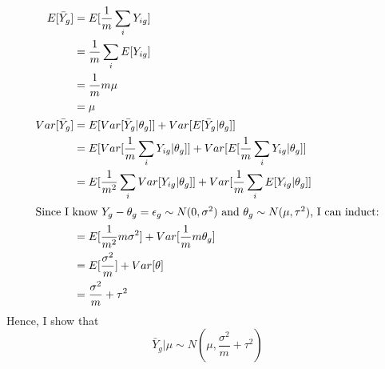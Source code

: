 \documentclass[paper=letter, fontsize=11pt]{scrartcl} %
\numberwithin{equation}{section} %
\numberwithin{figure}{section} %
\numberwithin{table}{section} %
\begin{document}
\subsection*{}
\begin{align*}
\begin{split}
E[\bar{Y}_g] &= E[\frac{1}{m}\sum_iY_{ig}] \\
&=  \frac{1}{m} \sum_i E[Y_{ig}] \\
&=  \frac{1}{m}m\mu \\
&= \mu \\
Var[\bar{Y}_g] &= E[Var[\bar{Y}_g|\theta_g]] + Var[E[\bar{Y}_g|\theta_g]] \\
&= E[Var[\frac{1}{m}\sum_iY_{ig}|\theta_g]] + Var[E[\frac{1}{m}\sum_iY_{ig}|\theta_g]] \\
&= E[\frac{1}{m^2}\sum_i Var[Y_{ig}|\theta_g]] + Var[\frac{1}{m}\sum_iE[Y_{ig}|\theta_g]] \\
\intertext{Since I know $Y_g - \theta_g = \epsilon_g \sim N(0,\sigma^2)$ and $\theta_g \sim N(\mu,\tau^2)$, I can induct:}
&= E[\frac{1}{m^2} m \sigma^2] + Var[\frac{1}{m}m\theta_g] \\
&= E[\frac{\sigma^2}{m}] + Var[\theta] \\
&= \frac{\sigma^2}{m} + \tau^2 
\end{split}
\end{align*}
Hence, I show that 
\[
\bar{Y}_g|\mu \sim N(\mu, \frac{\sigma^2}{m} + \tau^2)
\]
\end{document}
